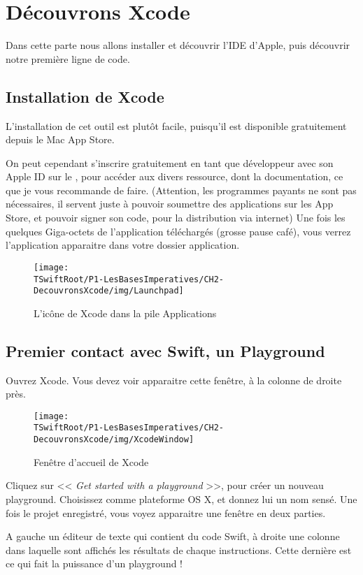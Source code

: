 \chapter{Découvrons Xcode}
Dans cette parte nous allons installer et découvrir l'IDE d’Apple,
puis découvrir notre première ligne de code.
\section{Installation de Xcode}
L'installation de cet outil est plutôt facile,
puisqu’il est disponible gratuitement depuis le Mac App Store.
 
On peut cependant s'inscrire gratuitement en tant que développeur
avec son Apple ID sur le
,
pour accéder aux divers ressource, dont la documentation,
ce que je vous recommande de faire.
(Attention, les programmes payants ne sont pas nécessaires,
il servent juste à pouvoir soumettre des applications sur les App Store,
et pouvoir signer son code, pour la distribution via internet)
Une fois les quelques Giga-octets de l'application téléchargés
(grosse pause café),
vous verrez l'application apparaitre dans votre dossier application.
\begin{figure}[H]
\centering
\texttt{[image: \\TSwiftRoot/P1-LesBasesImperatives/CH2-DecouvronsXcode/img/Launchpad]}
\caption{L'icône de Xcode dans la pile Applications}
\end{figure}

\section{Premier contact avec Swift, un Playground}
Ouvrez Xcode.
Vous devez voir apparaitre cette fenêtre, à la colonne de droite près.
\begin{figure}[H]
\centering
\texttt{[image: \\TSwiftRoot/P1-LesBasesImperatives/CH2-DecouvronsXcode/img/XcodeWindow]}
\caption{Fenêtre d'accueil de Xcode}
\end{figure}

Cliquez sur << \emph{Get started with a playground} >>,
pour créer un nouveau playground.
Choisissez comme plateforme OS X, et donnez lui un nom sensé.
Une fois le projet enregistré, vous voyez apparaitre une fenêtre en deux parties.

A gauche un éditeur de texte qui contient du code Swift,
à droite une colonne dans laquelle sont affichés
les résultats de chaque instructions.
Cette dernière est ce qui fait la puissance d'un playground !

